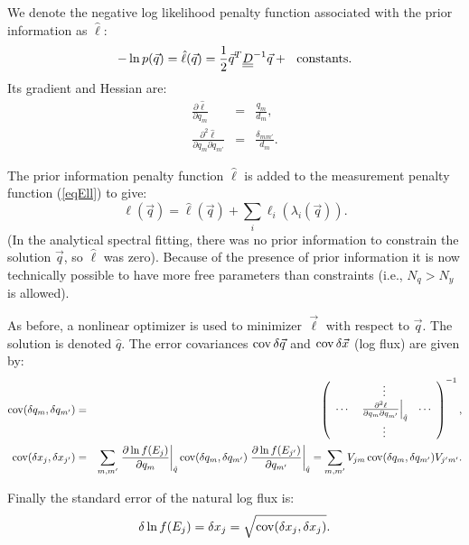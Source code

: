 \documentclass{article}    %
\newcommand{\dbul}[1]{\underline{\underline{#1}}}
\newcommand{\cov}{\mathop{{\rm cov}}}
\begin{document}
We denote the negative log likelihood penalty function associated with the prior information as
$\hat{\ell}$:
\begin{equation}
-\ln p(\vec{q}) = \hat{\ell}(\vec{q}) = \frac{1}{2}\vec{q}^T\dbul{D}^{-1}\vec{q} + {\rm ~~ constants}.
\end{equation}
Its gradient and Hessian are:
\begin{eqnarray}
\frac{\partial \hat{\ell}}{\partial q_m} &=& \frac{q_m}{d_m}, \\ 
\frac{\partial^2 \hat{\ell}}{\partial q_m \partial q_{m'}} &=& \frac{\delta_{mm'}}{d_m}.
\end{eqnarray}

The prior information penalty function $\hat{\ell}$ is added to the measurement penalty function (\ref{eqEll}) to give:
\begin{equation}
\ell(\vec{q}) = \hat{\ell}(\vec{q}) + \sum_i \ell_i(\lambda_i(\vec{q})). \label{eqEll2}
\end{equation}
(In the analytical spectral fitting, there was no prior information to
constrain the solution $\vec{q}$, so $\hat{\ell}$ was zero). Because of the presence of prior
information it is now technically possible to have more free
parameters than constraints (i.e., $N_q > N_y$ is allowed).

As before, a nonlinear optimizer is used to minimizer $\vec{\ell}$
with respect to $\vec{q}$. The solution is denoted $\hat{q}$. The
error covariances $\cov \delta \vec{q}$ and $\cov \delta \vec{x}$ (log flux) are given by:
\begin{eqnarray}
\cov(\delta q_m, \delta q_{m'}) &=& \left(
\begin{array}{ccc}
~ & \vdots & ~ \\
\cdots & \left.
\frac{\partial^2 \ell}{\partial q_m \partial q_{m'}}
\right|_{\hat{q}}
& \cdots \\
~ & \vdots & ~ 
\end{array}
\right)^{-1}, \\
\cov(\delta x_j,\delta x_{j'}) &=&
\sum_{m,m'}\left.\frac{\partial \ln f(E_j)}{\partial q_m}\right|_{\hat{q}}
\cov(\delta q_m, \delta q_{m'})
\left.\frac{\partial \ln f(E_{j'})}{\partial q_{m'}}\right|_{\hat{q}}
= 
\sum_{m,m'}V_{jm}\cov(\delta q_m, \delta q_{m'})V_{j'm'}.
\end{eqnarray}

Finally the standard error of the natural log flux is:
\begin{equation}
\delta \ln f(E_j) = \delta x_j = \sqrt{\cov(\delta x_j,\delta x_j)}.
\end{equation}
\end{document}

